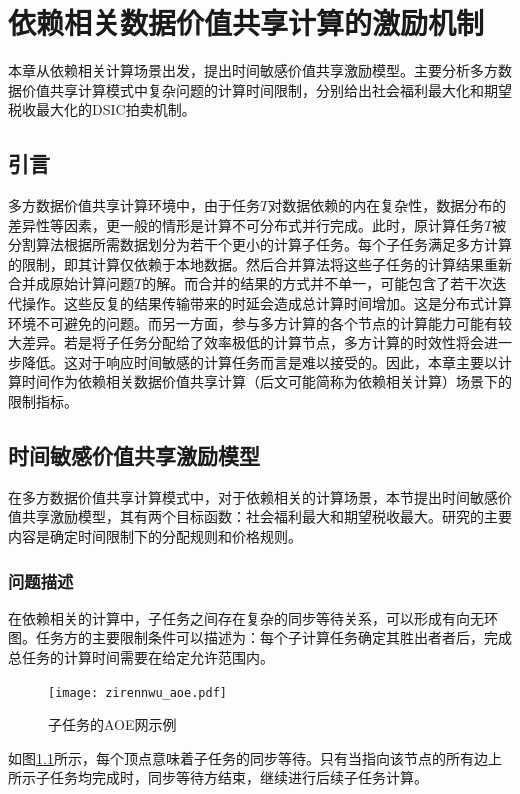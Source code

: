 \documentclass[promaster]{thesis-uestc}
\begin{document}
\chapter{依赖相关数据价值共享计算的激励机制}
本章从依赖相关计算场景出发，提出时间敏感价值共享激励模型。主要分析多方数据价值共享计算模式中复杂问题的计算时间限制，分别给出社会福利最大化和期望税收最大化的DSIC拍卖机制。

\section{引言}
多方数据价值共享计算环境中，由于任务$T$对数据依赖的内在复杂性，数据分布的差异性等因素，更一般的情形是计算不可分布式并行完成。此时，原计算任务$T$被分割算法根据所需数据划分为若干个更小的计算子任务。每个子任务满足多方计算的限制，即其计算仅依赖于本地数据。然后合并算法将这些子任务的计算结果重新合并成原始计算问题$T$的解。而合并的结果的方式并不单一，可能包含了若干次迭代操作。这些反复的结果传输带来的时延会造成总计算时间增加。这是分布式计算环境不可避免的问题。而另一方面，参与多方计算的各个节点的计算能力可能有较大差异。若是将子任务分配给了效率极低的计算节点，多方计算的时效性将会进一步降低。这对于响应时间敏感的计算任务而言是难以接受的。因此，本章主要以计算时间作为依赖相关数据价值共享计算（后文可能简称为依赖相关计算）场景下的限制指标。

\section{时间敏感价值共享激励模型}
在多方数据价值共享计算模式中，对于依赖相关的计算场景，本节提出时间敏感价值共享激励模型，其有两个目标函数：社会福利最大和期望税收最大。研究的主要内容是确定时间限制下的分配规则和价格规则。

\subsection{问题描述}
在依赖相关的计算中，子任务之间存在复杂的同步等待关系，可以形成有向无环图。任务方的主要限制条件可以描述为：每个子计算任务确定其胜出者者后，完成总任务的计算时间需要在给定允许范围内。

\begin{figure}[h]
\texttt{[image: zirennwu\_aoe.pdf]}
\caption{子任务的AOE网示例}
\label{zirennwu_aoe}
\end{figure}

如图\ref{zirennwu_aoe}所示，每个顶点意味着子任务的同步等待。只有当指向该节点的所有边上所示子任务均完成时，同步等待方结束，继续进行后续子任务计算。
\end{document}
